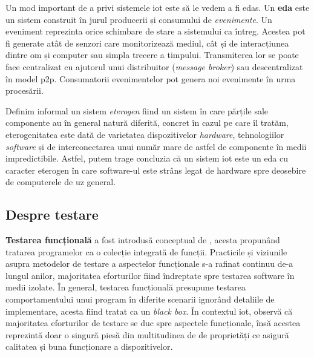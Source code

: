 

Un mod important de a privi sistemele \acrshort{iot} este să le vedem a fi \acrfull{edas}. Un \textbf{\acrshort{eda}} este un sistem construit în jurul producerii și consumului de \emph{evenimente}. Un eveniment reprezinta orice schimbare de stare a sistemului ca întreg. Acestea pot fi generate atât de senzori care monitorizează mediul, cât și de interacțiunea dintre om și computer sau simpla trecere a timpului. Transmiterea lor se poate face centralizat cu ajutorul unui distribuitor (\textit{message broker}) sau descentralizat în model \acrfull{p2p}. Consumatorii evenimentelor pot genera noi evenimente în urma procesării.

Definim informal un sistem \emph{eterogen} fiind un sistem în care părțile sale componente au în general natură diferită, concret în cazul pe care îl tratăm, eterogenitatea este dată de varietatea dispozitivelor \emph{hardware}, tehnologiilor \emph{software} și de interconectarea unui număr mare de astfel de componente în medii impredictibile. Astfel, putem trage concluzia că un sistem \acrshort{iot} este un \acrshort{eda} cu caracter eterogen în care software-ul este strâns legat de hardware spre deosebire de computerele de uz general. 


\subsection*{Despre testare}


\textbf{Testarea funcțională} a fost introdusă conceptual de \citet{Howden1980}, acesta propunând tratarea programelor ca o colecție integrată de funcții. Practicile și viziunile asupra metodelor de testare a aspectelor funcționale s-a rafinat continuu de-a lungul anilor, majoritatea eforturilor fiind îndreptate spre testarea software în medii izolate. În general, testarea funcțională presupune testarea comportamentului unui program în diferite scenarii ignorând detaliile de implementare, acesta fiind tratat ca un \textit{black box}. În contextul \acrshort{iot}, \citet{Corts2019} observă că majoritatea eforturilor de testare se duc spre aspectele funcționale, însă acestea reprezintă doar o singură piesă din multitudinea de de proprietăți ce asigură calitatea și buna funcționare a dispozitivelor.

